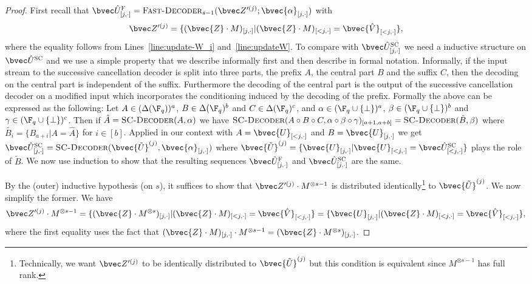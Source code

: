 \documentclass[11pt]{article}
\begin{document}
\begin{proof}
	First recall that $\UF_{[j,\cdot]} = \textsc{Fast-Decoder$_{s-1}$}(\Zpj; \bvec{\alpha}_{[j, \cdot]})$
	with 
	\[\Zpj = \{ (\bvec{Z}\cdot M)_{[j,\cdot]} | (\bvec{Z}\cdot M)_{[<j,\cdot]} = \bvec{\hat V}_{[<j,\cdot]}\},\] 
	where the equality follows from Lines~\ref{line:update-W_i} and~\ref{line:updateW}.
	To compare with
	$\USC_{[j,\cdot]}$ we need a inductive structure on $\USC$ and we use a simple property that we describe informally first and then
	describe in formal notation. Informally, if the input stream to the successive cancellation decoder is split into three parts, the prefix
	$A$, the central part $B$ and the suffix $C$, then the decoding on the central part is independent of the suffix. Furthermore the decoding of the central
	part is the output of the successive cancellation decoder on a modified input which incorporates the conditioning induced by the decoding of the prefix.
	Formally the above can be expressed as the following: 
	Let $A \in (\Delta(\F_q))^a$, $B \in \Delta(\F_q)^b$ and $C \in \Delta(\F_q)^c$, and $\alpha \in (\F_q \cup \{\bot\})^a$,
	$\beta \in (\F_q \cup \{\bot\})^b$ and $\gamma \in (\F_q \cup \{\bot\})^c$. Then if $\hat{A} = \textsc{SC-Decoder}(A,\alpha)$ we have
	$\textsc{SC-Decoder}(A\circ B \circ C, \alpha \circ \beta \circ \gamma)_{[a+1,a+b]} = \textsc{SC-Decoder}(\tilde{B}, \beta)$ where $\tilde{B_i} = \{B_{a+i} | A = \hat{A} \}$ for  $i \in [b]$. 
	Applied in our context with $A = \bvec{U}_{[<j,\cdot]}$ and $B = \bvec{U}_{[j,\cdot]}$ we get 
	$\USC_{[j,\cdot]} = \textsc{SC-Decoder}(\bvec{\tilde{U}}^{(j)},\bvec{\alpha}_{[j,\cdot]})$ where $\bvec{\tilde{U}}^{(j)} = \{\bvec{U}_{[j,\cdot]} | \bvec{U}_{[<j,\cdot]} = \USC_{[<j,\cdot]}\}$ plays the role of $\tilde{B}$. We now use induction to show that the resulting sequences $\UF_{[j,\cdot]}$ and $\USC_{[j,\cdot]}$  are the same.
	
	By the (outer) inductive hypothesis (on $s$), it suffices to show that $\Zpj\cdot M^{\otimes s-1}$ is distributed identically\footnote{Technically, we want $\Zpj$ to be identically distributed to $\bvec{\tilde{U}}^{(j)}$ but this condition is equivalent since $M^{\otimes s-1}$ has full rank.} to $\bvec{\tilde{U}}^{(j)}$. We now simplify the former. We have 
	$$\Zpj\cdot M^{\otimes s-1} = \{ (\bvec{Z}\cdot M^{\otimes s})_{[j,\cdot]} | (\bvec{Z}\cdot M)_{[<j,\cdot]} = \bvec{\hat V}_{[<j,\cdot]}\} = \{ \bvec{U}_{[j,\cdot]} | (\bvec{Z}\cdot M)_{[<j,\cdot]} = \bvec{\hat V}_{[<j,\cdot]}\},$$
	where the first equality uses the fact that $(\bvec{Z}\cdot M)_{[j,\cdot]}\cdot M^{\otimes s-1}=(\bvec{Z}\cdot M^{\otimes s})_{[j,\cdot]}$.


\end{proof}
\end{document}

